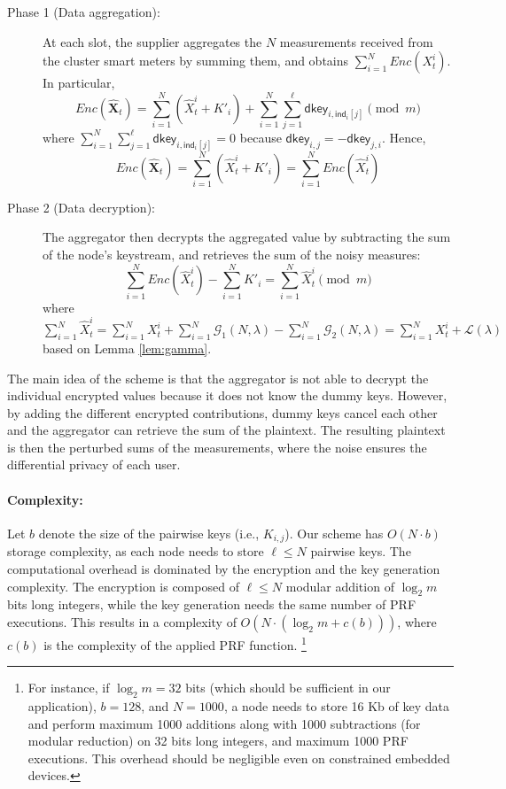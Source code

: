 \documentclass[11pt,a4paper]{article}
\theoremstyle{plain}
\theoremstyle{plain}
\theoremstyle{plain}
\theoremstyle{plain}
\theoremstyle{nonumberplain} \theoremseparator{}
\begin{document}
\begin{description}
\item[Phase 1 (Data aggregation):] At each slot, the supplier aggregates the $N$ measurements received from the cluster smart meters by summing them, and obtains $\sum^N_{i=1} \mathit{Enc}(X_{t}^{i})$. In particular,
$$\mathit{Enc}(\hat{\mathbf{X}}_{t}) = \sum^N_{i=1} (\hat{X}_{t}^{i} + K'_i)  + \sum^N_{i=1}\sum^\ell_{j=1} \mathsf{dkey}_{i,\mathsf{ind}_i[j]} \pmod{m}$$
where $\sum^N_{i=1}\sum^\ell_{j=1} \mathsf{dkey}_{i,\mathsf{ind}_i[j]}=0$ because $\mathsf{dkey}_{i,j}=-\mathsf{dkey}_{j,i}$. Hence, 
$$
\mathit{Enc}(\hat{\mathbf{X}}_{t}) = \sum^N_{i=1} (\hat{X}_{t}^{i} + K'_i) = \sum^N_{i=1} \mathit{Enc}(\hat{X}_{t}^{i})
$$


\item[Phase 2 (Data decryption):] The aggregator then decrypts the aggregated value by subtracting the sum of the node's keystream, and retrieves the sum of the noisy measures:
$$
\sum^N_{i=1} \mathit{Enc}(\hat{X}_{t}^{i}) - \sum^N_{i=1} K'_i = \sum^N_{i=1} \hat{X}_{t}^{i}  \pmod{m}
$$
where $\sum^N_{i=1} \hat{X}_{t}^{i} = \sum^N_{i=1} X_{t}^{i} + \sum^N_{i=1} \mathcal{G}_{1}(N, \lambda) - \sum^N_{i=1} \mathcal{G}_{2}(N, \lambda) = \sum^N_{i=1} X_{t}^{i} + \mathcal{L}(\lambda)$
based on Lemma \ref{lem:gamma}.
\end{description}
The main idea of the scheme is that the aggregator is not able to decrypt the
individual encrypted values because it does not know the dummy keys.
However, by adding the different encrypted contributions, dummy keys
cancel each other and the aggregator can retrieve the sum of the plaintext. 
The resulting plaintext is then the perturbed sums of the measurements, where the
noise ensures the differential privacy of each user.

\paragraph{Complexity:} Let $b$ denote the size of the pairwise keys (i.e., $K_{i,j}$). Our scheme has $O(N \cdot b)$ storage complexity, as each node needs to store $\ell \leq N$ pairwise keys. The computational overhead is dominated by the encryption and the key generation complexity. The encryption is composed of $\ell \leq N$ modular addition of $\log_2 m$ bits long integers, while the key generation needs the same number of PRF executions. This results in a complexity of $O(N \cdot (\log_2 m + c(b)))$, where $c(b)$ is the complexity of the applied PRF function. \footnote{For instance, if $\log_2 m=32$ bits (which should be sufficient in our application), $b=128$, and $N=1000$, a node needs to store 16 Kb of key data and perform  maximum 1000 additions along with 1000 subtractions (for modular reduction) on 32 bits long integers, and maximum 1000 PRF executions. This overhead should be negligible even on constrained embedded devices.}
\end{document}
